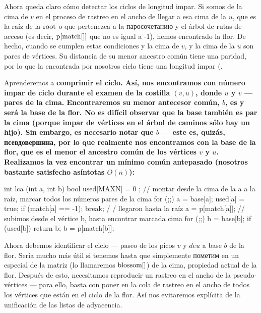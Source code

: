 Ahora queda claro cómo detectar los ciclos de longitud impar. Si somos de la cima de $v$ en el proceso de rastreo en el ancho de llegar a esa cima de la $u$, que es la raíz de la $\rm root$ o que pertenezca a la паросочетанию y el árbol de rutas de acceso (es decir, $\rm p[match[]]$ que no es igual a -1), hemos encontrado la flor. De hecho, cuando se cumplen estas condiciones y la cima de $v$, y la cima de la $u$ son pares de vértices. Su distancia de su menor ancestro común tiene una paridad, por lo que la encontrada por nosotros ciclo tiene una longitud impar (.

Aprenderemos a \bf{comprimir el ciclo}. Así, nos encontramos con número impar de ciclo durante el examen de la costilla $(v,u)$, donde $u$ y $v$ --- pares de la cima. Encontraremos su menor antecesor común, $b$, es y será la base de la flor. No es difícil observar que la base también es par la cima (porque impar de vértices en el árbol de caminos sólo hay un hijo). Sin embargo, es necesario notar que $b$ --- este es, quizás, псевдовершина, por lo que realmente nos encontramos con la base de la flor, que es el menor el ancestro común de los vértices $v$ y $u$. Realizamos la vez encontrar un mínimo común antepasado (nosotros bastante satisfecho asíntotas $O(n)$):

\code
int lca (int a, int b) {
bool used[MAXN] = { 0 };
// montar desde la cima de la a a la raíz, marcar todos los números pares de la cima
for (;;) {
a = base[a];
used[a] = true;
if (match[a] == -1); break; / / llegaron hasta la raíz
a = p[match[a]];
}
// subimos desde el vértice b, hasta encontrar marcada cima
for (;;) {
b = base[b];
if (used[b]) return b;
b = p[match[b]];
}
}
\endcode

Ahora debemos identificar el ciclo --- paseo de los picos $v$ y $de u$ a base $b$ de la flor. Sería mucho más útil si tenemos hasta que simplemente пометим en un especial de la matriz (lo llamaremos $\rm blossom[]$) de la cima, propiedad actual de la flor. Después de esto, necesitamos reproducir un rastreo en el ancho de la pseudo-vértices --- para ello, basta con poner en la cola de rastreo en el ancho de todos los vértices que están en el ciclo de la flor. Así nos evitaremos explícita de la unificación de las listas de adyacencia.

